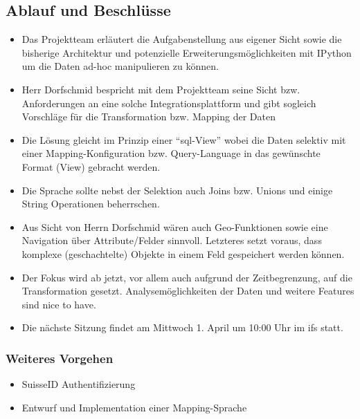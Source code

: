 \documentclass[class=scrbook,crop=false]{standalone}
\begin{document}
	\subsection*{Ablauf und Beschlüsse}
	\begin{itemize}
		\item Das Projektteam erläutert die Aufgabenstellung aus eigener Sicht sowie die bisherige Architektur und potenzielle Erweiterungsmöglichkeiten mit IPython um die Daten ad-hoc manipulieren zu können.
		\item Herr Dorfschmid bespricht mit dem Projektteam seine Sicht bzw. Anforderungen an eine solche Integrationsplattform und gibt sogleich Vorschläge für die Transformation bzw. Mapping der Daten
		\item Die Lösung gleicht im Prinzip einer ``\acs{sql}-View'' wobei die Daten selektiv mit einer Mapping-Konfiguration bzw. Query-Language in das gewünschte Format (View) gebracht werden.
		\item Die Sprache sollte nebst der Selektion auch Joins bzw. Unions und einige String Operationen beherrschen.
		\item Aus Sicht von Herrn Dorfschmid wären auch Geo-Funktionen sowie eine Navigation über Attribute/Felder sinnvoll. Letzteres setzt voraus, dass komplexe (geschachtelte) Objekte in einem Feld gespeichert werden können.
		\item Der Fokus wird ab jetzt, vor allem auch aufgrund der Zeitbegrenzung, auf die Transformation gesetzt. Analysemöglichkeiten der Daten und weitere Features sind nice to have.
		\item Die nächste Sitzung findet am Mittwoch 1. April um 10:00 Uhr im \acs{ifs} statt.
	\end{itemize}
	
	\subsubsection*{Weiteres Vorgehen}
	\begin{itemize}
		\item SuisseID Authentifizierung
		\item Entwurf und Implementation einer Mapping-Sprache
	\end{itemize}
\end{document}
